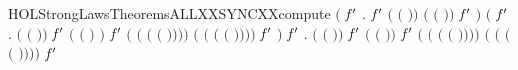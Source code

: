 \begin{SaveVerbatim}{HOLStrongLawsTheoremsALLXXSYNCXXcompute}
\HOLTokenTurnstile{} \ensuremath{(}\HOLSymConst{\HOLTokenForall{}} \ensuremath{\HOLBoundVar{f}\sp{\prime}} .
           \ensuremath{\HOLBoundVar{f}\sp{\prime}}  \HOLSymConst{\ensuremath{=}}
         \ensuremath{(} \ensuremath{(} \ensuremath{)}\ensuremath{)} \ensuremath{(} \ensuremath{(} \ensuremath{)}\ensuremath{)} \ensuremath{\HOLBoundVar{f}\sp{\prime}} \ensuremath{)} \HOLSymConst{\HOLTokenConj{}}
   \ensuremath{(}\HOLSymConst{\HOLTokenForall{}}  \ensuremath{\HOLBoundVar{f}\sp{\prime}} .
          \ensuremath{(} \ensuremath{(} \ensuremath{)}\ensuremath{)} \ensuremath{\HOLBoundVar{f}\sp{\prime}}  \HOLSymConst{\ensuremath{=}}
          \ensuremath{(} \ensuremath{(} \ensuremath{)} \HOLSymConst{\ensuremath{-}} \ensuremath{)} \ensuremath{\HOLBoundVar{f}\sp{\prime}}  \HOLSymConst{\ensuremath{+}}
         \ensuremath{(} \ensuremath{(} \ensuremath{(} \ensuremath{(} \ensuremath{)}\ensuremath{)}\ensuremath{)}\ensuremath{)}
          \ensuremath{(} \ensuremath{(} \ensuremath{(} \ensuremath{(} \ensuremath{)}\ensuremath{)}\ensuremath{)}\ensuremath{)} \ensuremath{\HOLBoundVar{f}\sp{\prime}} \ensuremath{)} \HOLSymConst{\HOLTokenConj{}}
   \HOLSymConst{\HOLTokenForall{}}  \ensuremath{\HOLBoundVar{f}\sp{\prime}} .
         \ensuremath{(} \ensuremath{(} \ensuremath{)}\ensuremath{)} \ensuremath{\HOLBoundVar{f}\sp{\prime}}  \HOLSymConst{\ensuremath{=}}
         \ensuremath{(} \ensuremath{(} \ensuremath{)}\ensuremath{)} \ensuremath{\HOLBoundVar{f}\sp{\prime}}  \HOLSymConst{\ensuremath{+}}
        \ensuremath{(} \ensuremath{(} \ensuremath{(} \ensuremath{(} \ensuremath{)}\ensuremath{)}\ensuremath{)}\ensuremath{)}
         \ensuremath{(} \ensuremath{(} \ensuremath{(} \ensuremath{(} \ensuremath{)}\ensuremath{)}\ensuremath{)}\ensuremath{)} \ensuremath{\HOLBoundVar{f}\sp{\prime}} 
\end{SaveVerbatim}
